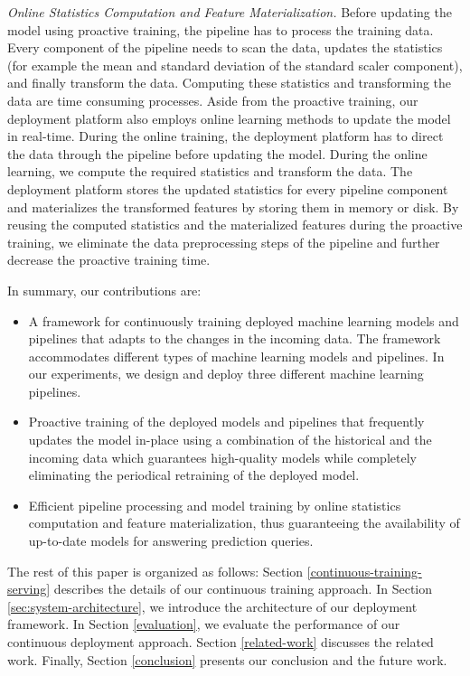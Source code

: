 \textit{Online Statistics Computation and Feature Materialization.}
Before updating the model using proactive training, the pipeline has to process the training data.
Every component of the pipeline needs to scan the data, updates the statistics (for example the mean and standard deviation of the standard scaler component), and finally transform the data.
Computing these statistics and transforming the data are time consuming processes.
Aside from the proactive training, our deployment platform also employs online learning methods to update the model in real-time.
During the online training, the deployment platform has to direct the data through the pipeline before updating the model.
During the online learning, we compute the required statistics and transform the data.
The deployment platform stores the updated statistics for every pipeline component and materializes the transformed features by storing them in memory or disk.
By reusing the computed statistics and the materialized features during the proactive training, we eliminate the data preprocessing steps of the pipeline and further decrease the proactive training time.

In summary, our contributions are:
\begin{itemize}
\item A framework for continuously training deployed machine learning models and pipelines that adapts to the changes in the incoming data. The framework accommodates different types of machine learning models and pipelines. In our experiments, we design and deploy three different machine learning pipelines.
\item Proactive training of the deployed models and pipelines that frequently updates the model in-place using a combination of the historical and the incoming data which guarantees high-quality models while completely eliminating the periodical retraining of the deployed model.
\item Efficient pipeline processing and model training by online statistics computation and feature materialization, thus guaranteeing the availability of up-to-date models for answering prediction queries.
\end{itemize}

The rest of this paper is organized as follows:
Section \ref{continuous-training-serving} describes the details of our continuous training approach.
In Section \ref{sec:system-architecture}, we introduce the architecture of our deployment framework.
In Section \ref{evaluation}, we evaluate the performance of our continuous deployment approach.
Section \ref {related-work} discusses the related work.
Finally, Section \ref{conclusion} presents our conclusion and the future work.